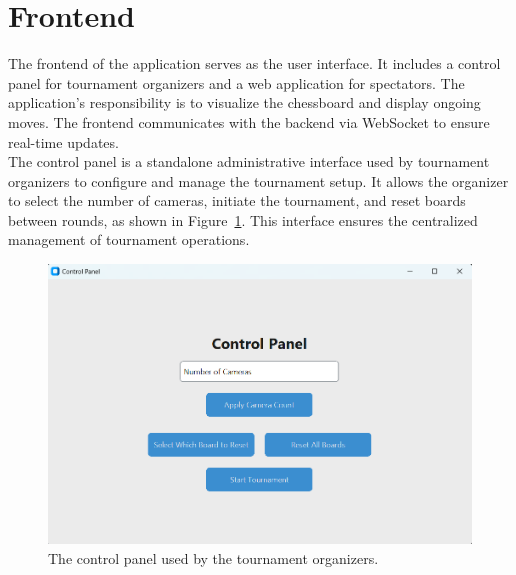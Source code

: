 % 

% 

% 



\section{Frontend}
\label{subsec:results-frontend}
The frontend of the application serves as the user interface. It includes a control panel for tournament organizers and a web application for spectators. The application's responsibility is to visualize the chessboard and display ongoing moves. The frontend communicates with the backend via WebSocket to ensure real-time updates. \\

The control panel is a standalone administrative interface used by tournament organizers to configure and manage the tournament setup. It allows the organizer to select the number of cameras, initiate the tournament, and reset boards between rounds, as shown in Figure~\ref{fig:control-panel}. This interface ensures the centralized management of tournament operations. \\

\begin{figure}[h!] \centering \includegraphics[width=0.75\linewidth]{figures/results/frontend/control-panel/control-panel.png} \caption[Control panel for tournament organizers]{The control panel used by the tournament organizers.}\label{fig:control-panel} \end{figure}

